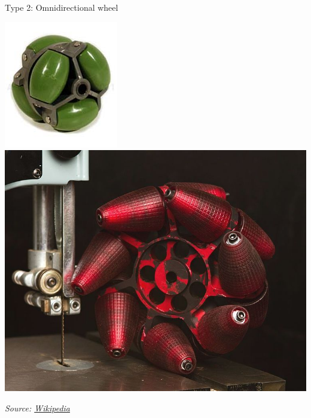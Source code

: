 \documentclass[compress]{beamer}
\newcommand{\source}[2]{{\tiny\it Source: \href{#1}{#2}}}
\begin{document}
\begin{frame}{Type 2: Omnidirectional wheel}
{    \begin{center}
        \includegraphics[width=0.4\linewidth]{omniwheel2}
        \includegraphics[width=0.4\linewidth]{omniwheel3}

        \source{https://en.wikipedia.org/wiki/Mecanum_wheel}{Wikipedia}
    \end{center}
}

\end{frame}
\end{document}
